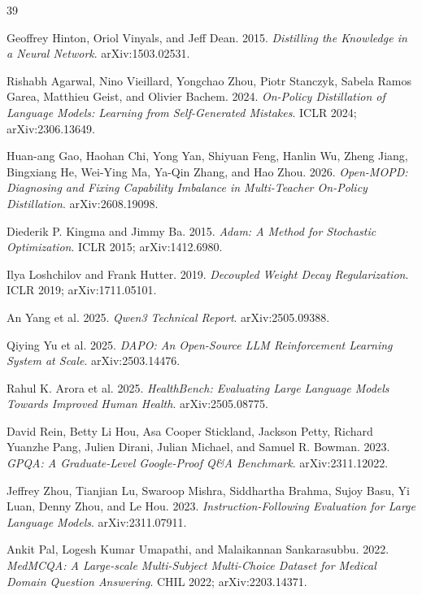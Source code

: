 \documentclass{article}
\begin{document}
\begin{thebibliography}{39}

 Geoffrey Hinton, Oriol Vinyals, and Jeff Dean. 2015. \emph{Distilling the Knowledge in a Neural Network}. arXiv:1503.02531.

 Rishabh Agarwal, Nino Vieillard, Yongchao Zhou, Piotr Stanczyk, Sabela Ramos Garea, Matthieu Geist, and Olivier Bachem. 2024. \emph{On-Policy Distillation of Language Models: Learning from Self-Generated Mistakes}. ICLR 2024; arXiv:2306.13649.

 Huan-ang Gao, Haohan Chi, Yong Yan, Shiyuan Feng, Hanlin Wu, Zheng Jiang, Bingxiang He, Wei-Ying Ma, Ya-Qin Zhang, and Hao Zhou. 2026. \emph{Open-MOPD: Diagnosing and Fixing Capability Imbalance in Multi-Teacher On-Policy Distillation}. arXiv:2608.19098.
 
 Diederik P. Kingma and Jimmy Ba. 2015. \emph{Adam: A Method for Stochastic Optimization}. ICLR 2015; arXiv:1412.6980.

 Ilya Loshchilov and Frank Hutter. 2019. \emph{Decoupled Weight Decay Regularization}. ICLR 2019; arXiv:1711.05101.

 An Yang et al. 2025. \emph{Qwen3 Technical Report}. arXiv:2505.09388.

 Qiying Yu et al. 2025. \emph{DAPO: An Open-Source LLM Reinforcement Learning System at Scale}. arXiv:2503.14476.

 Rahul K. Arora et al. 2025. \emph{HealthBench: Evaluating Large Language Models Towards Improved Human Health}. arXiv:2505.08775.

 David Rein, Betty Li Hou, Asa Cooper Stickland, Jackson Petty, Richard Yuanzhe Pang, Julien Dirani, Julian Michael, and Samuel R. Bowman. 2023. \emph{GPQA: A Graduate-Level Google-Proof Q\&A Benchmark}. arXiv:2311.12022.

 Jeffrey Zhou, Tianjian Lu, Swaroop Mishra, Siddhartha Brahma, Sujoy Basu, Yi Luan, Denny Zhou, and Le Hou. 2023. \emph{Instruction-Following Evaluation for Large Language Models}. arXiv:2311.07911.

 Ankit Pal, Logesh Kumar Umapathi, and Malaikannan Sankarasubbu. 2022. \emph{MedMCQA: A Large-scale Multi-Subject Multi-Choice Dataset for Medical Domain Question Answering}. CHIL 2022; arXiv:2203.14371.


\end{thebibliography}
\end{document}
